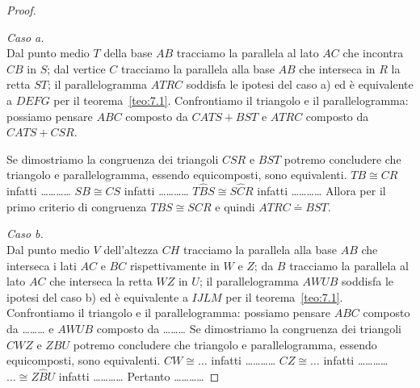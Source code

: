 \begin{proof}~\vspace{4pt}\\
\noindent\begin{minipage}{0.65\textwidth}\parindent15pt
\noindent\emph{Caso a.}\\
Dal punto medio \(T\) della base \(AB\) tracciamo la parallela al lato 
\(AC\) che incontra \(CB\) in \(S\); dal vertice \(C\) tracciamo la parallela 
alla base \(AB\) che interseca in \(R\) la retta \(ST\); il parallelogramma 
\(ATRC\) soddisfa le ipotesi del caso a) ed è equivalente a \(DEFG\) per 
il teorema~\ref{teo:7.1}.
Confrontiamo il triangolo e il parallelogramma: possiamo pensare 
\(ABC\) composto da \(CATS+BST\) e \(ATRC\) composto da \(CATS+CSR\).
\end{minipage}\hfil
\begin{minipage}{0.35\textwidth}
  \centering
\end{minipage}\vspace{1pt}
Se dimostriamo la congruenza dei triangoli \(CSR\) e \(BST\) potremo 
concludere che triangolo e parallelogramma, essendo equicomposti, 
sono equivalenti. 
\(TB\cong CR\) infatti \ldots\ldots\ldots\ldots{}
\(SB\cong CS\) infatti \ldots\ldots\ldots\ldots{}
\(T\widehat{B}S\cong S\widehat{C}R\) infatti \ldots\ldots\ldots\ldots{}
Allora per il primo criterio di congruenza \(TBS\cong SCR\) e quindi 
\(ATRC\doteq BST\).\\

\noindent\begin{minipage}{0.65\textwidth}\parindent15pt
\noindent\emph{Caso b.}\\
Dal punto medio \(V\) dell'altezza \(CH\) tracciamo la parallela alla 
base \(AB\) che interseca i lati \(AC\) e \(BC\) rispettivamente in \(W\) e 
\(Z\); da \(B\) tracciamo la parallela al lato \(AC\) che interseca la retta 
\(WZ\) in \(U\); il parallelogramma \(AWUB\) soddisfa le ipotesi del caso b) 
ed è equivalente a \(IJLM\) per il teorema~\ref{teo:7.1}.
Confrontiamo il triangolo e il parallelogramma: possiamo pensare 
\(ABC\) composto da \ldots\ldots\ldots{} e \(AWUB\) composto da 
\ldots\ldots\ldots{}
Se dimostriamo la congruenza dei triangoli \(CWZ\) e \(ZBU\) potremo 
concludere che triangolo e parallelogramma, essendo equicomposti, 
sono equivalenti.
\(CW\cong \ldots{}\) infatti \ldots\ldots\ldots\ldots{}
\(CZ\cong \ldots{}\) infatti \ldots\ldots\ldots\ldots{}
\(\ldots{}\cong Z\widehat{B}U\) infatti \ldots\ldots\ldots\ldots{}
Pertanto \ldots\ldots\ldots\ldots{}
\end{minipage}\hfil
\begin{minipage}{0.35\textwidth}
  \centering
\end{minipage}\vspace{1pt}
\end{proof}

